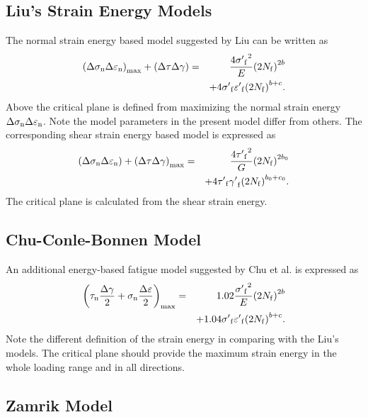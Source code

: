 \documentclass[preprint,5p,twocolumn,11pt,sort&compress]{elsarticle}
\begin{document}
\subsection{Liu's Strain Energy Models}
The normal strain energy based model suggested by Liu  \cite{Socie2000} can be written as
\begin{eqnarray*}
{\left( {\Delta {\sigma _{\rm n}}\Delta {\varepsilon _{\rm n}}} \right)_{\max }} + \left( {\Delta \tau \Delta \gamma } \right) &=& \frac{{4{{\sigma '}_{\rm f}}^2}}{E}{\left( {2{N_{\rm f}}} \right)^{2b}}
\\
& & + 4{{\sigma '}_{\rm f}}{{\varepsilon '}_{\rm f}}{\left( {2{N_{\rm f}}} \right)^{b + c}}.
\end{eqnarray*}
Above the critical plane is defined from maximizing the normal strain energy ${\Delta {\sigma _{\rm n}}\Delta {\varepsilon _{\rm n}}}$. Note the model parameters in the present model differ from others. The corresponding shear strain energy based model is expressed as
\begin{eqnarray*}
\left( {\Delta {\sigma _{\rm n}}\Delta {\varepsilon _{\rm n}}} \right) + {\left( {\Delta \tau \Delta \gamma } \right)_{\max }} &=& \frac{{4{{\tau '}_{\rm f}}^2}}{G}{\left( {2{N_{\rm f}}} \right)^{2b_0 }}
\\
&& + 4{{\tau '}_{\rm f}}{{\gamma '}_{\rm f}}{\left( {2{N_{\rm f}}} \right)^{b_0  + c_0 }}.
\end{eqnarray*}
The critical plane is calculated from the shear strain energy.

\subsection{Chu-Conle-Bonnen Model}
An additional energy-based fatigue model suggested by Chu et al.  \cite{Socie2000} is expressed as
\begin{eqnarray*}
{\left( {{\tau _{\rm n}}\frac{{\Delta \gamma }}{2} + {\sigma _{\rm n }}\frac{{\Delta \varepsilon }}{2}} \right)_{\max }} &=& 1.02\frac{{{{\sigma '}_{\rm f}}^2}}{E}{\left( {2{N_{\rm f}}} \right)^{2b}} \\
&& + 1.04{{\sigma '}_{\rm f}}{{\varepsilon '}_{\rm f}}{\left( {2{N_{\rm f}}} \right)^{b + c}}.
\end{eqnarray*}
Note the different definition of the strain energy in comparing with the Liu's models. The critical plane should provide the maximum strain energy in the whole loading range and in all directions.
 
\subsection{Zamrik Model}
\end{document}
